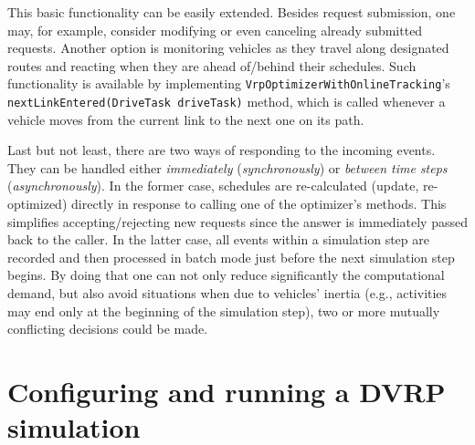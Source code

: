 This basic functionality can be easily extended. Besides request submission, one may, for example, consider modifying or even canceling already submitted requests. Another option is monitoring vehicles as they travel along designated routes and reacting when they are ahead of/behind their schedules. Such functionality is available by implementing \lstinline$VrpOptimizerWithOnlineTracking$'s \lstinline$nextLinkEntered(DriveTask driveTask)$ method, which is called whenever a vehicle moves from the current link to the next one on its path.

Last but not least, there are two ways of responding to the incoming events. They can be handled either \emph{immediately} (\emph{synchronously}) or \emph{between time steps} (\emph{asynchronously}). In the former case, schedules are re-calculated (update, re-optimized) directly in response to calling one of the optimizer's methods. This simplifies accepting/rejecting new requests since the answer is immediately passed back to the caller. In the latter case, all events within a simulation step are recorded and then processed in batch mode just before the next simulation step begins. By doing that one can not only reduce significantly the computational demand, but also avoid situations when due to vehicles' inertia (e.g., activities may end only at the beginning of the simulation step), two or more mutually conflicting decisions could be made.


\section{Configuring and running a DVRP simulation}

